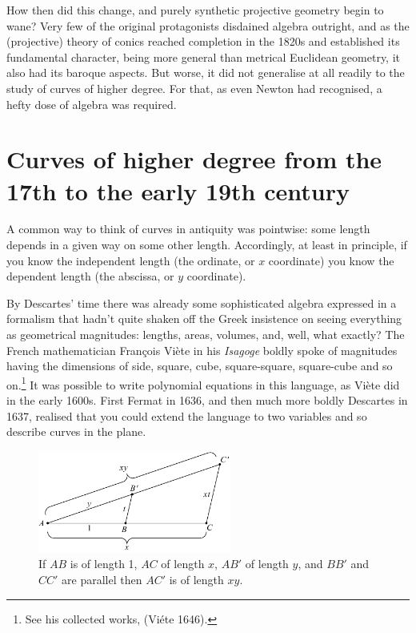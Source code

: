 How then did this change, and purely synthetic projective geometry begin to wane? Very few of the original protagonists disdained algebra outright, and as the (projective) theory of conics reached completion in the 1820s and established its fundamental character, being more general than metrical Euclidean geometry, it also had its baroque aspects. But worse, it did not generalise at all readily  to the study of curves of higher degree. For that, as even Newton had recognised, a hefty dose of algebra was required.







\section{Curves of higher degree from the 17th to the early 19th century} A common way to think of curves in antiquity was pointwise: some length depends in a given way on some other length. Accordingly, at least in principle, if you know the independent length
(the ordinate, or $x$ coordinate) you know the dependent length (the abscissa, or $y$ coordinate).  

By Descartes' time there was already some sophisticated algebra expressed in a formalism that hadn't quite shaken off   the Greek insistence on seeing everything as geometrical magnitudes: lengths, areas, volumes, and, well, what exactly? The French mathematician Fran\c{c}ois Vi\`ete in his \emph{Isagoge} boldly spoke of magnitudes having the dimensions of side, square, cube, square-square, square-cube and so on.\footnote{See his collected works, (Vi\'ete 1646).} It was possible to write polynomial equations in this language, as Vi\`ete did in the early 1600s. First Fermat in 1636, and then much more boldly Descartes in 1637, realised that you could extend the language to two variables and so describe curves in the plane.


\begin{figure}
  \includegraphics[width=180pt]{main/Multiplication} 
\caption{If $AB$ is of length 1, $AC$ of length $x$, $AB'$ of 
length $y$, and $BB'$ and $CC'$ are parallel then $AC'$ is of length $xy$.
}
      \label{figmultiplication}
\end{figure}

